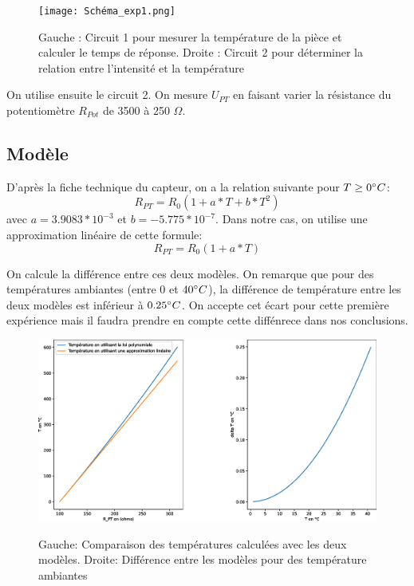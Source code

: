 \documentclass[12pt]{article}
\begin{document}
\newpage
\begin{figure}[h!]
	\begin{center}
		\texttt{[image: Schéma\_exp1.png]}
		\label{Schéma_exp1}
		\caption{Gauche : Circuit 1 pour mesurer la température de la pièce et calculer le temps de réponse. Droite : Circuit 2 pour déterminer la relation entre l'intensité et la température}
	\end{center}
\end{figure}

On utilise ensuite le circuit 2. On mesure $U_{PT}$ en faisant varier la résistance du potentiomètre $R_{Pot}$ de 3500 à 250 $\Omega$.

\subsection{Modèle}
D'après la fiche technique du capteur, on a la relation suivante pour $T\geq 0\degree C$:
\begin{equation}
R_{PT}=R_0(1+a*T+b*T^2)
\end{equation}
avec $a=3.9083*10^{-3}$ et $b=-5.775*10^{-7}$. Dans notre cas, on utilise une approximation linéaire de cette formule:
\begin{equation}
R_{PT}=R_0(1+a*T)
\label{Modèle_linéaire}
\end{equation}

On calcule la différence entre ces deux modèles. On remarque que pour des températures ambiantes (entre $0$ et $40\degree C$), la différence de température entre les deux modèles est inférieur à $0.25\degree C$. On accepte cet écart pour cette première expérience mais il faudra prendre en compte cette diffénrece dans nos conclusions. 
\begin{figure}[h!]
	\begin{center}
		\includegraphics[scale=0.3]{Comparaison.eps}
		\label{Comparaison}
		\caption{Gauche: Comparaison des températures calculées avec les deux modèles. Droite: Différence entre les modèles pour des température ambiantes}
	\end{center}
\end{figure}
\end{document}
